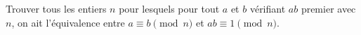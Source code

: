 Trouver tous les entiers $n$ pour lesquels pour tout $a$ et $b$ vérifiant $ab$ premier avec $n$, on ait l'équivalence entre $a \equiv b \pmod{n}$ et $ab \equiv 1 \pmod{n}$.
